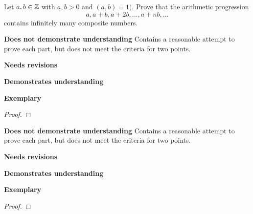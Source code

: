 \documentclass[letterpaper, 11pt]{../ximera}
\begin{document}
\begin{ex}
Let $a,b\in\mathbb Z$ with $a,b>0$ and $(a,b)=1)$. Prove that the arithmetic progression 
	\[a, a+b, a+2b, \dots, a+nb,\dots\]
contains infinitely many composite numbers.
\end{ex}

\begin{writeRubric}
    \item \textbf{Does not demonstrate understanding}
     Contains a reasonable attempt to prove each part, but does not meet the criteria for two points.
    \item \textbf{Needs revisions}
     
    \item \textbf{Demonstrates understanding}
    
    \item \textbf{Exemplary}
        
\end{writeRubric}
                                       \begin{proof}
 
\end{proof}

\begin{ex}
 
\end{ex}

\begin{writeRubric}
    \item \textbf{Does not demonstrate understanding}
     Contains a reasonable attempt to prove each part, but does not meet the criteria for two points.
    \item \textbf{Needs revisions}
     
    \item \textbf{Demonstrates understanding}
    
    \item \textbf{Exemplary}
        
\end{writeRubric}
                                       \begin{proof}
 
\end{proof}
\end{document}
